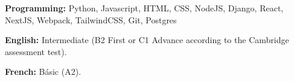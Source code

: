 

\begin{cvpubs}

  \cvpub
    {
      \begin{cvlist}
        \item{\textbf{Programming:} Python, Javascript, HTML, CSS, NodeJS, Django, React, NextJS, Webpack, TailwindCSS, Git, Postgres }
        \item{\textbf{English:} Intermediate (B2 First or C1 Advance according to the Cambridge assessment test). }
        \item{\textbf{French:} Básic (A2). }
      \end{cvlist}
    }\vspace{-4pt}
\end{cvpubs}